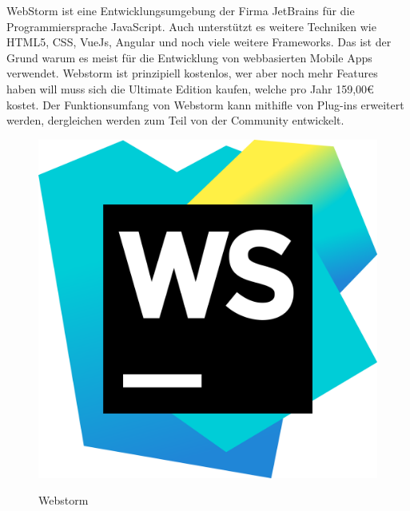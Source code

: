 WebStorm ist eine Entwicklungsumgebung der Firma JetBrains für die Programmiersprache JavaScript. Auch unterstützt es weitere Techniken wie HTML5, CSS, VueJs, Angular und noch viele weitere Frameworks. Das ist der Grund warum es meist für die Entwicklung von webbasierten Mobile Apps verwendet.
Webstorm ist prinzipiell kostenlos, wer aber noch mehr Features haben will muss sich die Ultimate Edition kaufen, welche pro Jahr 159,00€ kostet.
Der Funktionsumfang von Webstorm kann mithifle von Plug-ins erweitert werden, dergleichen werden zum Teil von der Community entwickelt.

\begin{figure}[h!]
    \centering
    \includegraphics[width=0.1\linewidth]{pics/WebStorm_Icon.png}
    \caption{Webstorm}
    \label{fig:enter-label}
    \cite{webstorm_grafik}
\end{figure}

\cite{Webstorm}



